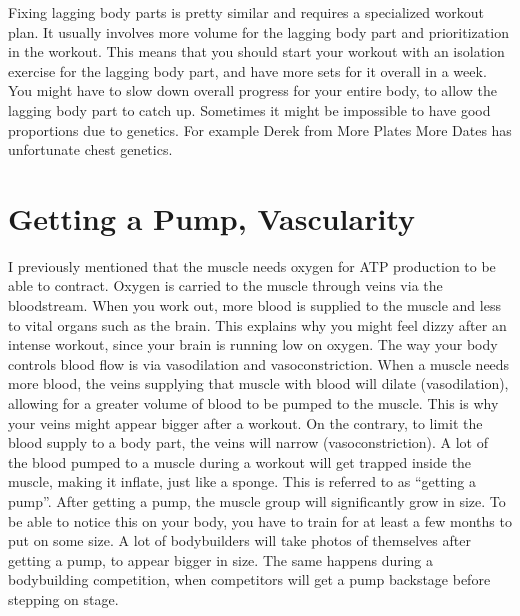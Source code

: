 \documentclass[openany, 12pt]{book}
\begin{document}
        Fixing lagging body parts is pretty similar and requires a specialized workout plan. It usually involves more volume for the lagging body part and prioritization in the workout. This means that
        you should start your workout with an isolation exercise for the lagging body part, and have more sets for it overall in a week.
        You might have to slow down overall progress for your entire body, to allow the lagging body part to catch up. Sometimes it might be impossible to have good proportions due to genetics. For example
        Derek from More Plates More Dates has unfortunate chest genetics.

        \section{Getting a Pump, Vascularity}

        I previously mentioned that the muscle needs oxygen for ATP production to be able to contract. Oxygen is carried to the muscle through veins via the bloodstream.
        When you work out, more blood is supplied to the muscle and less to vital organs such as the brain. This explains why you might feel dizzy after an intense workout,
        since your brain is running low on oxygen. The way your body controls blood flow is via vasodilation and vasoconstriction. When a muscle needs more blood,
        the veins supplying that muscle with blood will dilate (vasodilation), allowing for a greater volume of blood to be pumped to the muscle. This is why your veins might
        appear bigger after a workout. On the contrary, to limit the blood supply to a body part, the veins will narrow (vasoconstriction).
        A lot of the blood pumped to a muscle during a workout will get trapped inside the muscle, making it inflate, just like a sponge. This is referred to as ``getting a pump''.
        After getting a pump, the muscle group will significantly grow in size. To be able to notice this on your body, you have to train for at least a few months to put on some size.
        A lot of bodybuilders will take photos of themselves after getting a pump, to appear bigger in size. The same happens during a bodybuilding competition, when competitors will get a pump
        backstage before stepping on stage.
\end{document}
